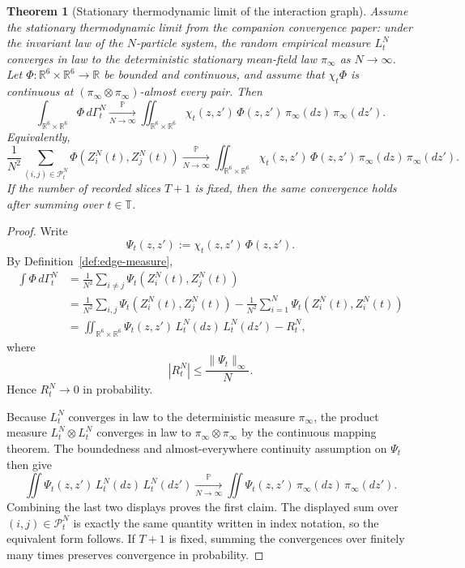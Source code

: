 \documentclass[11pt]{article}
\newtheorem{theorem}{Theorem}[section]
\theoremstyle{remark}
\newcommand{\R}{\mathbb R}
\newcommand{\Tset}{\mathbb T}
\begin{document}
\begin{theorem}[Stationary thermodynamic limit of the interaction graph]
\label{thm:edge-measure-limit}
Assume the stationary thermodynamic limit from the companion convergence paper:
under the invariant law of the $N$-particle system, the random empirical
measure $L_t^N$ converges in law to the deterministic stationary mean-field law
$\pi_\infty$ as $N\to\infty$.
Let $\Phi:\R^6\times\R^6\to\R$ be bounded and continuous, and assume that
$\chi_t\Phi$ is continuous at $(\pi_\infty\otimes\pi_\infty)$-almost every pair.
Then
\[
\int_{\R^6\times\R^6}\Phi\,d\Gamma_t^N
\xrightarrow[N\to\infty]{\mathbb P}
\iint_{\R^6\times\R^6}
\chi_t(z,z')\,\Phi(z,z')\,\pi_\infty(dz)\,\pi_\infty(dz').
\]
Equivalently,
\[
\frac1{N^2}\sum_{(i,j)\in\mathcal P_t^N}\Phi(Z_i^N(t),Z_j^N(t))
\xrightarrow[N\to\infty]{\mathbb P}
\iint_{\R^6\times\R^6}
\chi_t(z,z')\,\Phi(z,z')\,\pi_\infty(dz)\,\pi_\infty(dz').
\]
If the number of recorded slices $T+1$ is fixed, then the same convergence
holds after summing over $t\in\Tset$.
\end{theorem}
\begin{proof}
Write
\[
\Psi_t(z,z'):=\chi_t(z,z')\,\Phi(z,z').
\]
By Definition~\ref{def:edge-measure},
\begin{align*}
\int \Phi\,d\Gamma_t^N
&=
\frac1{N^2}\sum_{i\ne j}\Psi_t(Z_i^N(t),Z_j^N(t))\\
&=
\frac1{N^2}\sum_{i,j}\Psi_t(Z_i^N(t),Z_j^N(t))
-\frac1{N^2}\sum_{i=1}^N \Psi_t(Z_i^N(t),Z_i^N(t))\\
&=
\iint_{\R^6\times\R^6}\Psi_t(z,z')\,L_t^N(dz)\,L_t^N(dz')
-R_t^N,
\end{align*}
where
\[
|R_t^N|\le \frac{\|\Psi_t\|_\infty}{N}.
\]
Hence $R_t^N\to0$ in probability.

Because $L_t^N$ converges in law to the deterministic measure $\pi_\infty$,
the product measure $L_t^N\otimes L_t^N$ converges in law to
$\pi_\infty\otimes\pi_\infty$ by the continuous mapping theorem.
The boundedness and almost-everywhere continuity assumption on $\Psi_t$ then give
\[
\iint \Psi_t(z,z')\,L_t^N(dz)\,L_t^N(dz')
\xrightarrow[N\to\infty]{\mathbb P}
\iint \Psi_t(z,z')\,\pi_\infty(dz)\,\pi_\infty(dz').
\]
Combining the last two displays proves the first claim.
The displayed sum over $(i,j)\in\mathcal P_t^N$ is exactly the same quantity
written in index notation, so the equivalent form follows.
If $T+1$ is fixed, summing the convergences over finitely many times preserves
convergence in probability.
\end{proof}
\end{document}
